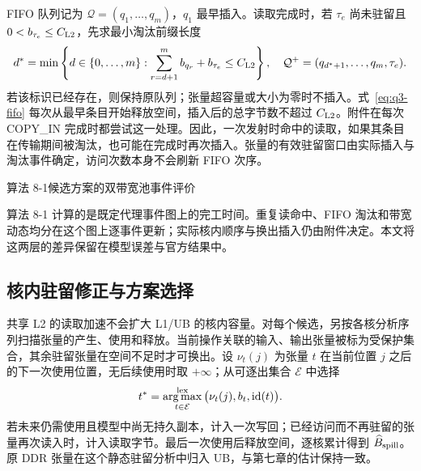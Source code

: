 FIFO 队列记为 $\mathcal Q=(q_1,\ldots,q_m)$，$q_1$ 最早插入。读取完成时，若 $\tau_e$ 尚未驻留且 $0<b_{\tau_e}\le C_{\rm L2}$，先求最小淘汰前缀长度
\begin{equation}
d^*=\min\left\{d\in\{0,\ldots,m\}:\sum_{r=d+1}^{m}b_{q_r}+b_{\tau_e}\le C_{\rm L2}\right\},
\quad \mathcal Q^+=(q_{d^*+1},\ldots,q_m,\tau_e).
\label{eq:q3-fifo}
\end{equation}
若该标识已经存在，则保持原队列；张量超容量或大小为零时不插入。式~\eqref{eq:q3-fifo} 每次从最早条目开始释放空间，插入后的总字节数不超过 $C_{\rm L2}$。附件在每次 COPY\_IN 完成时都尝试这一处理。因此，一次发射时命中的读取，如果其条目在传输期间被淘汰，也可能在完成时再次插入。张量的有效驻留窗口由实际插入与淘汰事件确定，访问次数本身不会刷新 FIFO 次序。

\begin{algorithmblock}{算法 8-1\quad 候选方案的双带宽池事件评价}
\end{algorithmblock}

算法 8-1 计算的是既定代理事件图上的完工时间。重复读命中、FIFO 淘汰和带宽动态均分在这个图上逐事件更新；实际核内顺序与换出插入仍由附件决定。本文将这两层的差异保留在模型误差与官方结果中。

\subsection{核内驻留修正与方案选择}
共享 L2 的读取加速不会扩大 L1/UB 的核内容量。对每个候选，另按各核分析序列扫描张量的产生、使用和释放。当前操作关联的输入、输出张量被标为受保护集合，其余驻留张量在空间不足时才可换出。设 $\nu_t(j)$ 为张量 $t$ 在当前位置 $j$ 之后的下一次使用位置，无后续使用时取 $+\infty$；从可逐出集合 $\mathcal E$ 中选择
\begin{equation}
t^*=\operatorname*{arg\,max}_{t\in\mathcal E}^{\rm lex}
\big(\nu_t(j),b_t,\operatorname{id}(t)\big).
\label{eq:q3-victim}
\end{equation}
若未来仍需使用且模型中尚无持久副本，计入一次写回；已经访问而不再驻留的张量再次读入时，计入读取字节。最后一次使用后释放空间，逐核累计得到 $\widehat B_{\rm spill}$。原 DDR 张量在这个静态驻留分析中归入 UB，与第七章的估计保持一致。

